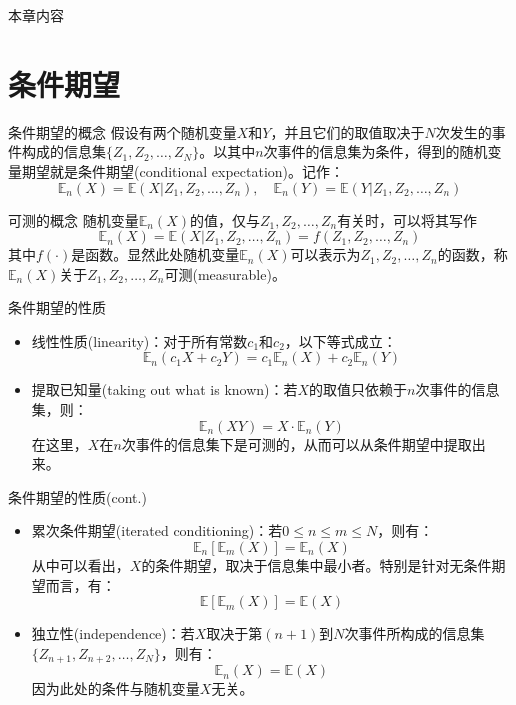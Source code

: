 \documentclass[t]{beamer}
\newcommand{\E}{\mathbb{E}}
\begin{document}
    \begin{frame}{本章内容}
      \begin{multicols*}{2}
        \tableofcontents
      \end{multicols*}
      
      \end{frame}

      \section{条件期望}

      \begin{frame}{条件期望的概念}
      假设有两个随机变量$X$和$Y$，并且它们的取值取决于$N$次发生的事件构成的信息集$\{Z_1,Z_2,\ldots,Z_N\}$。以其中$n$次事件的信息集为条件，得到的随机变量期望就是条件期望(conditional expectation)。记作：
      \begin{equation*}
      \E_n(X)=\E(X|Z_1,Z_2,\ldots,Z_n),\quad \E_n(Y)=\E(Y|Z_1,Z_2,\ldots,Z_n)
      \end{equation*}
      \end{frame}
      
      \begin{frame}{可测的概念}
      随机变量$\E_n(X)$的值，仅与$Z_1,Z_2,\ldots,Z_n$有关时，可以将其写作
      \begin{equation*}
      \E_n(X)=\E(X|Z_1,Z_2,\ldots,Z_n)=f(Z_1,Z_2,\ldots,Z_n)
      \end{equation*}
      其中$f(\cdot)$是函数。显然此处随机变量$\E_n(X)$可以表示为$Z_1,Z_2,\ldots,Z_n$的函数，称$\E_n(X)$关于$Z_1,Z_2,\ldots,Z_n$可测(measurable)。
      \end{frame}
      
      \begin{frame}{条件期望的性质}
      \begin{itemize}
      \item 线性性质(linearity)：对于所有常数$c_1$和$c_2$，以下等式成立：
      \[\E_n(c_1 X+c_2 Y)=c_1\E_n(X)+c_2\E_n(Y) \]
      \item 提取已知量(taking out what is known)：若$X$的取值只依赖于$n$次事件的信息集，则：
      \[\E_n(XY)=X\cdot \E_n(Y) \]
      在这里，$X$在$n$次事件的信息集下是可测的，从而可以从条件期望中提取出来。
      \end{itemize}
      \end{frame}
      
      \begin{frame}{条件期望的性质(cont.)}
      \begin{itemize}
      \item 累次条件期望(iterated conditioning)：若$0\le n\le m\le N$，则有：
      \[\E_n\left[\E_m(X)\right]=\E_n(X) \]
      从中可以看出，$X$的条件期望，取决于信息集中最小者。特别是针对无条件期望而言，有：
      \[\E\left[\E_m(X)\right]=\E(X) \]
      
      \item 独立性(independence)：若$X$取决于第$(n+1)$到$N$次事件所构成的信息集$\{Z_{n+1},Z_{n+2},\ldots,Z_N\}$，则有：
      \[\E_n(X)=\E(X) \]
      因为此处的条件与随机变量$X$无关。
      \end{itemize}
      \end{frame}
      
\end{document}
